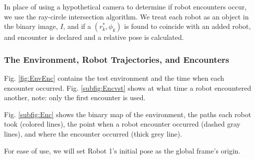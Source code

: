 In place of using a hypothetical camera to determine if robot encounters occur, we use the ray-circle intersection algorithm.  We treat each robot as an object in the binary image, $I$, and if a $(r_k^*,\phi_k)$ is found to coincide with an added robot, and encounter is declared and a relative pose is calculated.  



\subsubsection{The Environment, Robot Trajectories, and Encounters}

Fig. \ref{fig:EnvEnc} contains the test environment and the time when each encounter occurred.  Fig. \ref{subfig:Encvst} shows at what time a robot encountered another, note: only the first encounter is used.

Fig. \ref{subfig:Enc} shows the binary map of the environment, the paths each robot took (colored lines), the point when a robot encounter occurred (dashed gray lines), and where the encounter occurred (thick grey line).

For ease of use, we will set Robot 1's initial pose as the global frame's origin.  

